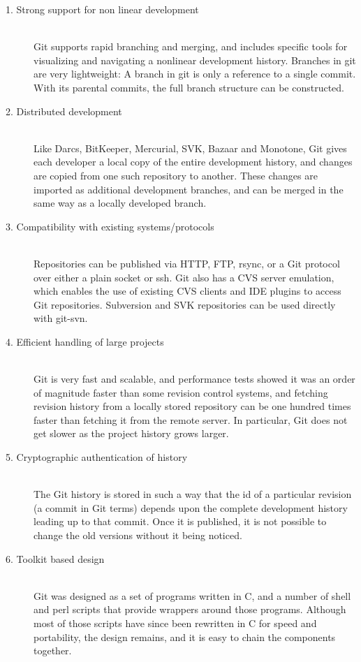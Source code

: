 \begin{description}

\item[1. Strong support for non linear development] \hfill \\
  Git supports rapid branching and merging, and includes specific tools for
  visualizing and navigating a nonlinear development history. Branches in git
  are very lightweight: A branch in git is only a reference to a single commit.
  With its parental commits, the full branch structure can be constructed.

\item[2. Distributed development] \hfill \\
  Like Darcs, BitKeeper, Mercurial, SVK, Bazaar and Monotone, Git gives each
  developer a local copy of the entire development history, and changes are
  copied from one such repository to another. These changes are imported as
  additional development branches, and can be merged in the same way as a
  locally developed branch.

\item[3. Compatibility with existing systems/protocols] \hfill \\
  Repositories can be published via HTTP, FTP, rsync, or a Git protocol over
  either a plain socket or ssh. Git also has a CVS server emulation, which
  enables the use of existing CVS clients and IDE plugins to access Git
  repositories. Subversion and SVK repositories can be used directly with
  git-svn.

\item[4. Efficient handling of large projects] \hfill \\
  Git is very fast and scalable, and performance tests showed it was an order of
  magnitude faster than some revision control systems, and fetching revision
  history from a locally stored repository can be one hundred times faster than
  fetching it from the remote server. In particular, Git does not get slower as
  the project history grows larger.

\item[5. Cryptographic authentication of history] \hfill \\
  The Git history is stored in such a way that the id of a particular revision
  (a commit in Git terms) depends upon the complete development history leading
  up to that commit. Once it is published, it is not possible to change the old
  versions without it being noticed.

\item[6. Toolkit based design] \hfill \\
  Git was designed as a set of programs written in C, and a number of shell and
  perl scripts that provide wrappers around those programs. Although most of
  those scripts have since been rewritten in C for speed and portability, the
  design remains, and it is easy to chain the components together.


\end{description}
